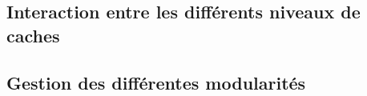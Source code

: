 \documentclass[a4paper]{article}
\begin{document}
\subsection{Interaction entre les différents niveaux de caches}

\subsection{Gestion des différentes modularités}

\newpage
\nocite{*}


\end{document}
